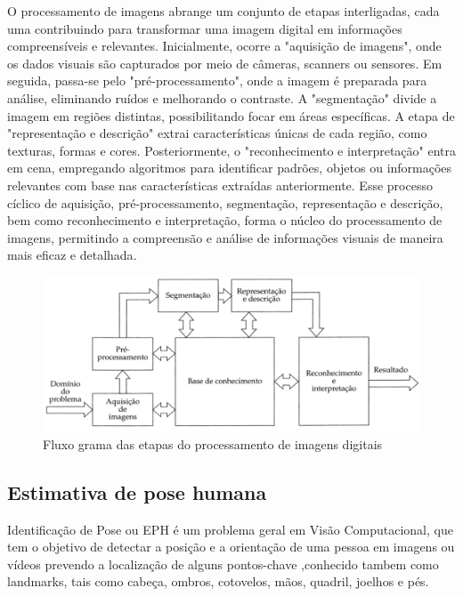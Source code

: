 O processamento de imagens abrange um conjunto de etapas interligadas, cada uma contribuindo para transformar uma imagem digital em informações compreensíveis e relevantes. Inicialmente, ocorre a "aquisição de imagens", onde os dados visuais são capturados por meio de câmeras, scanners ou sensores. Em seguida, passa-se pelo "pré-processamento", onde a imagem é preparada para análise, eliminando ruídos e melhorando o contraste. A "segmentação" divide a imagem em regiões distintas, possibilitando focar em áreas específicas. A etapa de "representação e descrição" extrai características únicas de cada região, como texturas, formas e cores. Posteriormente, o "reconhecimento e interpretação" entra em cena, empregando algoritmos para identificar padrões, objetos ou informações relevantes com base nas características extraídas anteriormente. Esse processo cíclico de aquisição, pré-processamento, segmentação, representação e descrição, bem como reconhecimento e interpretação, forma o núcleo do processamento de imagens, permitindo a compreensão e análise de informações visuais de maneira mais eficaz e detalhada\cite{imagemMonocromatica}.


\begin{figure}[!htb]
	\centering
	\includegraphics[scale=0.4]{figuras/processamento_imagem/ProcessamentoImagem.png}
	\caption{Fluxo grama das etapas do processamento de imagens digitais}
	\label{fig:Fluxo grama das etapas do processamento de imagens digitais}
\end{figure}




\subsection[Estimativa de pose humana]{Estimativa de pose humana}\label{sec:Estimativa de pose humana}
Identificação de Pose ou \ac{EPH} é um problema geral em Visão Computacional, que tem o objetivo de detectar a posição e a orientação de uma pessoa em imagens ou vídeos prevendo a localização de alguns pontos-chave ,conhecido tambem como landmarks, tais como  cabeça, ombros, cotovelos, mãos, quadril, joelhos e pés.\cite{edh}


